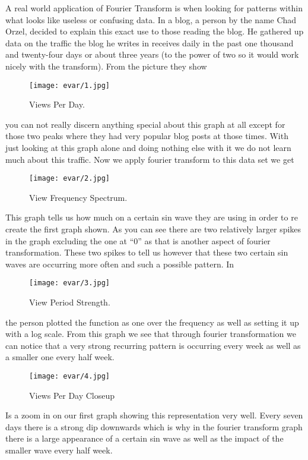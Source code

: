 \documentclass [../article.tex]{subfiles}
\begin{document}
  A real world application of Fourier Transform is when
  looking for patterns within what looks like useless or
  confusing data. In a blog, a person by the name Chad
  Orzel, decided to explain this exact use to those
  reading the blog. He gathered up data on the traffic the
  blog he writes in receives daily in the past one thousand
  and twenty-four days or about three years (to the power of
  two so it would work nicely with the transform).
  From the picture they show
  \begin{figure}[H]
    \texttt{[image: evar/1.jpg]}
    \caption{Views Per Day.}
    \label{fig:views}
  \end{figure}
  you can not really discern anything special about this graph
  at all except for those two peaks where they had very popular
  blog posts at those times. With just looking at this graph
  alone and doing nothing else with it we do not learn much
  about this traffic. Now we apply fourier transform to this
  data set we get
  \begin{figure}[H]
    \texttt{[image: evar/2.jpg]}
    \caption{View Frequency Spectrum.}
    \label{fig:viewfreq}
  \end{figure}
  This graph tells us how much on a certain sin wave they are
  using in order to re create the first graph shown. As you can
  see there are two relatively larger spikes in the graph
  excluding the one at “0” as that is another aspect of fourier
  transformation. These two spikes to tell us however that these
  two certain sin waves are occurring more often and such a
  possible pattern. In
  \begin{figure}[H]
    \texttt{[image: evar/3.jpg]}
    \caption{View Period Strength.}
    \label{fig:viewperiods}
  \end{figure}
  the person plotted the function as one over the frequency as
  well as setting it up with a log scale. From this graph we see
  that through  fourier transformation we can notice that a very
  strong recurring pattern is occurring every week as well as a
  smaller one every half week.
  \begin{figure}[H]
    \texttt{[image: evar/4.jpg]}
    \caption{Views Per Day Closeup}
    \label{fig:viewcloseup}
  \end{figure}
  Is a zoom in on our first graph showing this representation very
  well. Every seven days there is a strong dip downwards  which is
  why in the fourier transform graph there is a large appearance of
  a certain sin wave as well as the impact of the smaller wave every
  half week.
\end{document}
